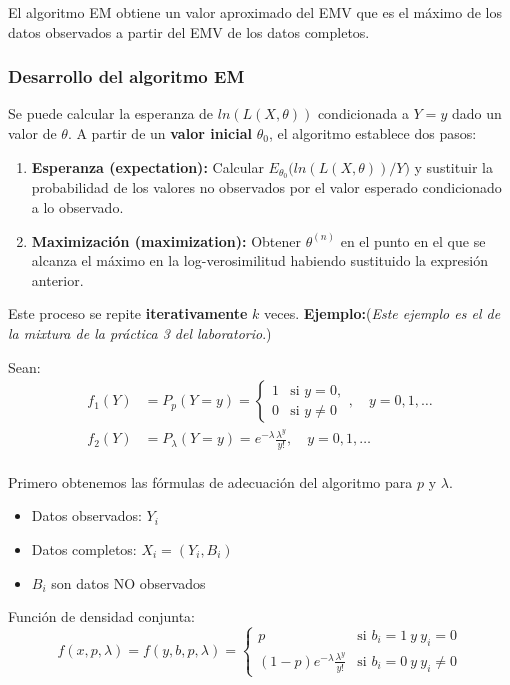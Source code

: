 El algoritmo EM obtiene un valor aproximado del EMV que es el máximo de los datos observados a partir del EMV de los datos completos.

\subsubsection{Desarrollo del algoritmo EM}
Se puede calcular la esperanza de $ln(L(X,\theta))$ condicionada a $Y=y$ dado un valor de $\theta$. A partir de un \textbf{valor inicial} $\theta_0$, el algoritmo establece dos pasos:
\begin{enumerate}
    \item \textbf{Esperanza (expectation):} Calcular $E_{\theta_0}\Big(ln(L(X,\theta))\big/Y\Big)$ y sustituir la probabilidad de los valores no observados por el valor esperado condicionado a lo observado.
    \item \textbf{Maximización (maximization):} Obtener $\theta^{(n)}$ en el punto en el que se alcanza el máximo en la log-verosimilitud habiendo sustituido la expresión anterior.
\end{enumerate} 
Este proceso se repite \textbf{iterativamente} $k$ veces. 
\newpage
\textbf{Ejemplo:}(\textit{Este ejemplo es el de la mixtura de la práctica 3 del laboratorio}.)

Sean:
\begin{align*}
    f_1(Y) &= P_p(Y=y) = 
    \begin{cases}
        1 & \text{si } y=0, \\
        0 & \text{si } y \neq 0
    \end{cases} , \quad y = 0, 1, \dots\\
    f_2(Y) &= P_\lambda(Y=y) = e^{-\lambda} \frac{\lambda^y}{y!}, \quad y = 0, 1, \dots
    \end{align*}   
 \\
Primero obtenemos las fórmulas de adecuación del algoritmo para $p$ y $\lambda$.
\begin{itemize}
    \item Datos observados: $Y_i$
    \item Datos completos: $X_i=(Y_i,B_i)$
    \item $B_i$ son datos NO observados
\end{itemize}
Función de densidad conjunta:
$$ f(x,p,\lambda)=f(y,b,p,\lambda)=\begin{cases}
    p & \text{si } b_i=1\ y\ y_i=0 \\
    (1-p)e^{-\lambda}\frac{\lambda^y}{y!} & \text{si } b_i=0\ y\ y_i \neq 0
\end{cases} $$

